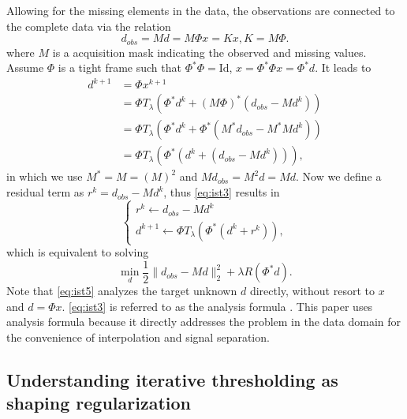 Allowing for the missing elements in the data, the observations are connected to the complete data via the relation
\begin{equation}
 d_{obs}=Md=M\Phi x=Kx, K=M\Phi.
 \end{equation}
where $M$ is a acquisition mask indicating the observed and missing values. Assume $\Phi$ is a tight frame such that $\Phi^*\Phi=\mathrm{Id}$, $x=\Phi^*\Phi x=\Phi^*d$. It leads to
\begin{equation}\label{eq:ist3}
  \begin{array}{ll}
    d^{k+1} & =\Phi x^{k+1} \\
      & =\Phi T_{\lambda}(\Phi^*d^{k}+(M\Phi)^*(d_{obs}-Md^{k})) \\
      & =\Phi T_{\lambda}(\Phi^*d^{k}+\Phi^*(M^*d_{obs}-M^*Md^{k})) \\
      & =\Phi T_{\lambda}(\Phi^*(d^{k}+(d_{obs}-Md^{k}))),
  \end{array}
\end{equation}
in which we use $M^*=M=(M)^2$ and $Md_{obs}=M^2d=Md$. Now we define a residual term as $r^{k}=d_{obs}-Md^{k}$, thus \eqref{eq:ist3} results in
\begin{equation}\label{eq:ist4}
  \left\{
  \begin{array}{l}
    r^{k}\leftarrow d_{obs}-Md^{k} \\
    d^{k+1}\leftarrow \Phi T_{\lambda}(\Phi^*(d^{k}+r^{k})),
  \end{array}
  \right.
\end{equation}
which is equivalent to solving
\begin{equation}\label{eq:ist5}
  \min\limits_{d}\frac{1}{2}\|d_{obs}-Md\|_2^2+\lambda R(\Phi^{*}d).
\end{equation}
Note that \eqref{eq:ist5} analyzes the target unknown $d$ directly, without resort to $x$ and $d=\Phi x$. \eqref{eq:ist3} is referred to as the analysis formula \citep{elad2007analysis}. This paper uses analysis formula because it directly addresses the problem in the data domain for the convenience of interpolation and signal separation.


\subsection{Understanding iterative thresholding as shaping regularization}

